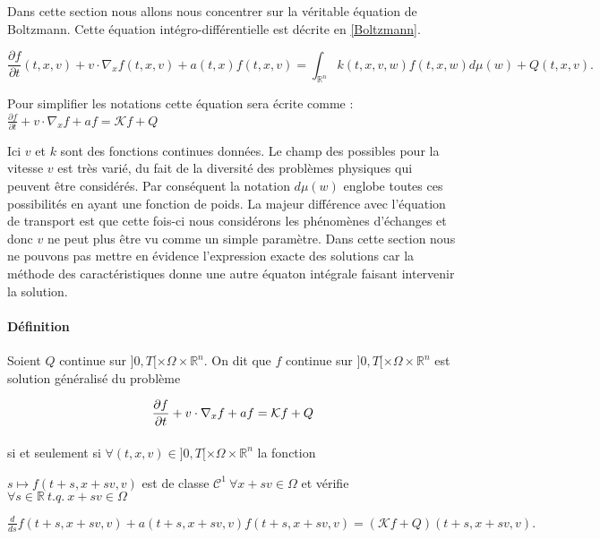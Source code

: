 \documentclass[onecolumn, 12pt, a4paper]{article}
\begin{document}
Dans cette section nous allons nous concentrer sur la véritable équation de Boltzmann. Cette équation intégro-différentielle est décrite en \ref{Boltzmann}.

\begin{equation} \label{Boltzmann}
\frac{\partial f}{\partial t}(t,x,v)+v \cdot \nabla_x f(t,x,v) + a(t,x)f(t,x,v) = \int_{\mathbb{R}^n}k(t,x,v,w)f(t,x,w)d\mu(w)+Q(t,x,v).
\end{equation}

Pour simplifier les notations cette équation sera écrite comme : $\frac{\partial f}{\partial t}+v \cdot \nabla_x f +af =   \mathcal{K} f +Q $

Ici $v$ et $k$ sont des fonctions continues données. Le champ des possibles pour la vitesse $v$ est très varié, du fait de la diversité des problèmes physiques qui peuvent être considérés. Par conséquent la notation $d\mu(w)$ englobe toutes ces possibilités en ayant une fonction de poids. La majeur différence avec l'équation de transport est que cette fois-ci nous considérons les phénomènes d'échanges et donc $v$ ne peut plus être vu comme un simple paramètre.
Dans cette section nous ne pouvons pas mettre en évidence l'expression exacte des solutions car la méthode des caractéristiques donne une autre équaton intégrale faisant intervenir la solution.




\paragraph{Définition}

Soient $Q$ continue sur $]0,T[\times \Omega \times \mathbb{R}^n$. On dit que $f$ continue sur $]0,T[\times \Omega \times \mathbb{R}^n$ est solution généralisé du problème 


$$\frac{\partial f}{\partial t}+v \cdot \nabla_x f +af = \mathcal{K} f +Q\\$$

\paragraph{}
si et seulement si $\forall (t,x,v) \in ]0,T[\times \Omega \times \mathbb{R}^n$ la fonction 

$s \mapsto f(t+s,x+sv,v)$ est de classe $\mathcal{C}^1 ~\forall x+sv \in  \Omega$ et vérifie $\forall s \in \mathbb{R} ~ t.q.~ x +sv \in \Omega$

$\frac{d}{ds}f(t+s,x+sv,v) +a(t+s,x+sv,v)f(t+s,x+sv,v) = (\mathcal{K}f+ Q)(t+s,x+sv,v).$
\end{document}
